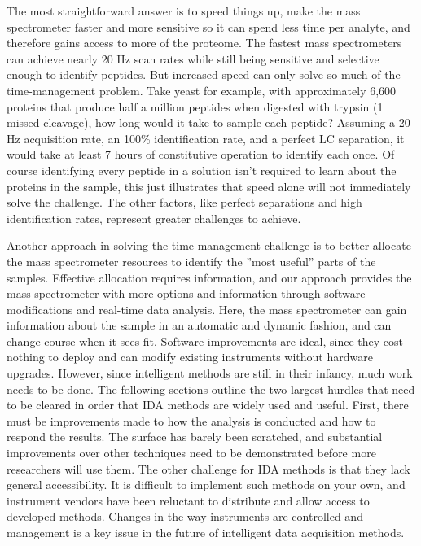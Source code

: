 The most straightforward answer is to speed things up, make the mass spectrometer faster and more sensitive so it can spend less time per analyte, and therefore gains access to more of the proteome. The fastest mass spectrometers can achieve nearly 20 Hz scan rates while still being sensitive and selective enough to identify peptides. But increased speed can only solve so much of the time-management problem. Take yeast for example, with approximately 6,600 proteins that produce half a million peptides when digested with trypsin (1 missed cleavage), how long would it take to sample each peptide? Assuming a 20 Hz acquisition rate, an 100\% identification rate, and a perfect LC separation, it would take at least 7 hours of constitutive operation to identify each once. Of course identifying every peptide in a solution isn't required to learn about the proteins in the sample, this just illustrates that speed alone will not immediately solve the challenge. The other factors, like perfect separations and high identification rates, represent greater challenges to achieve.

Another approach in solving the time-management challenge is to better allocate the mass spectrometer resources to identify the ''most useful'' parts of the samples. Effective allocation requires information, and our approach provides the mass spectrometer with more options and information through software modifications and real-time data analysis. Here, the mass spectrometer can gain information about the sample in an automatic and dynamic fashion, and can change course when it sees fit. Software improvements are ideal, since they cost nothing to deploy and can modify existing instruments without hardware upgrades. However, since intelligent methods are still in their infancy, much work needs to be done. The following sections outline the two largest hurdles that need to be cleared in order that IDA methods are widely used and useful. First, there must be improvements made to how the analysis is conducted and how to respond the results. The surface has barely been scratched, and substantial improvements over other techniques need to be demonstrated before more researchers will use them. The other challenge for IDA methods is that they lack general accessibility. It is difficult to implement such methods on your own, and instrument vendors have been reluctant to distribute and allow access to developed methods. Changes in the way instruments are controlled and management is a key issue in the future of intelligent data acquisition methods.

